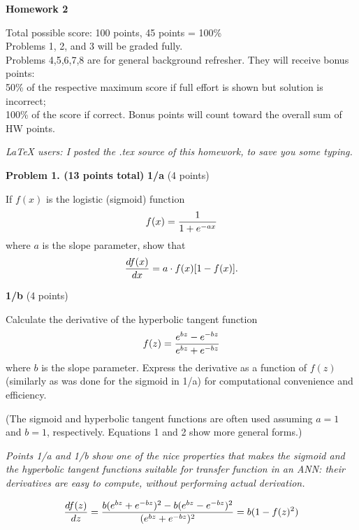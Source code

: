 \documentclass[epsfig]{article}
\def\bpar{\vskip26pt}
\def\npar{\vskip13pt}
\def\spar{\vskip10pt}
\begin{document}
\parindent=0pt


\null\bpar
\centerline{\bf Homework 2}
\npar
\begin{centering}{Total possible score: 100 points, 45 points = 100\%\\
Problems 1, 2, and 3 will be graded fully.\\
Problems 4,5,6,7,8 are for general background refresher. They will receive bonus points:  \\
50\% of the respective maximum score if full effort is shown but solution is incorrect; \\
100\% of the score if correct. Bonus points will count toward the overall sum of HW points.\\}
\end{centering}
\npar
\centerline{\sl  LaTeX users: I posted the .tex source of this homework, 
to save you some typing.}


\bpar
{\bf Problem 1. (13 points total)}
\spar
{\bf 1/a} (4 points)

If $f(x)$ is the logistic (sigmoid) function 
\begin{equation}
f(x) = {1\over 1 + e^{-ax}}
\end{equation}
where $a$ is the slope parameter, show that 
\begin{equation}
{df(x)\over {dx}} = a\cdot f(x)\lbrack 1 - f(x)\rbrack.
\end{equation}

\npar
{\bf 1/b} (4 points)

Calculate the derivative of the hyperbolic tangent function 
\begin{equation}
f(z) = {e^{bz} - e^{-bz}\over e^{bz} + e^{-bz}}
\end{equation}
 where $b$ is the slope parameter. Express the derivative as a function of $f(z)$ 
 (similarly as was done for the sigmoid in 1/a) for computational convenience and efficiency.

(The sigmoid and hyperbolic tangent functions are often used assuming $a=1$ and $b=1$, respectively. Equations 1 and 2 show more general forms.)

\npar
{\sl Points 1/a and 1/b show one of the nice properties that makes the sigmoid and the hyperbolic tangent 
functions suitable for transfer function in an ANN: their derivatives are easy to compute, without 
performing actual derivation.}

\centerline{\underline{}}


\begin{equation}
	{df(z)\over {dz}} ={b(e^{bz}+e^{-bz})^2-b(e^{bz}- e^{-bz})^2\over{(e^{bz} + e^{-bz})^2}}=b(1-f(z)^2)
\end{equation}
\end{document}
